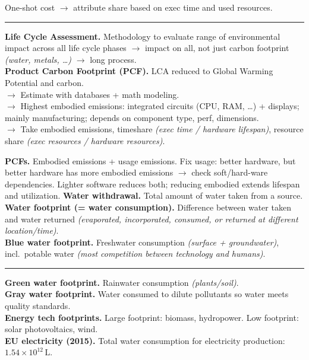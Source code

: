 \documentclass[8pt, a4paper]{extarticle}
\makeatletter
\renewcommand{\hline}{\noalign{\vskip 2px}\hrule\@height\arrayrulewidth\@width\linewidth\noalign{\vskip 2px}}
\makeatother
\begin{document}
\begin{minipage}[t]{0.48\textwidth}
{\begin{minipage}[t]{1\textwidth}
			One-shot cost $\rightarrow$ attribute share based on exec time and used resources.\hline
			\begin{minipage}[t]{0.495\textwidth}
				\textbf{Life Cycle Assessment.} Methodology to evaluate range of environmental impact across all life cycle phases
				$\rightarrow$ impact on all, not just carbon footprint \textit{(water, metals, \dots)} $\rightarrow$ long process.\\
				\textbf{Product Carbon Footprint (PCF).} LCA reduced to Global Warming Potential and carbon.\\
				$\rightarrow$ Estimate with databases + math modeling.\\
				$\rightarrow$ Highest embodied emissions: integrated circuits (CPU, RAM, \dots) + displays;
				mainly manufacturing; depends on component type, perf, dimensions.\\
				$\rightarrow$ Take embodied emissions, timeshare \textit{(exec time / hardware lifespan)},
				resource share \textit{(exec resources / hardware resources)}.
			\end{minipage}\hfill
			\begin{minipage}[t]{0.495\textwidth}
				\textbf{PCFs.} Embodied emissions + usage emissions.
				Fix usage: better hardware, but better hardware has more embodied emissions
				$\rightarrow$ check soft/hard-ware dependencies.
				Lighter software reduces both; reducing embodied extends lifespan and utilization.
				\textbf{Water withdrawal.} Total amount of water taken from a source.\\
				\textbf{Water footprint (= water consumption).} Difference between water taken and water returned
				\textit{(evaporated, incorporated, consumed, or returned at different location/time)}.\\
				\textbf{Blue water footprint.} Freshwater consumption \textit{(surface + groundwater)}, incl.\ potable water
				\textit{(most competition between technology and humans)}.
			\end{minipage}\hline
			\textbf{Green water footprint.} Rainwater consumption \textit{(plants/soil)}.\\
			\textbf{Gray water footprint.} Water consumed to dilute pollutants so water meets quality standards.\\
			\textbf{Energy tech footprints.} Large footprint: biomass, hydropower. Low footprint: solar photovoltaics, wind.\\
			\textbf{EU electricity (2015).} Total water consumption for electricity production:
			$1.54 \times 10^{12}\,\mathrm{L}$.\\

\end{minipage}}
\end{minipage}
\end{document}
